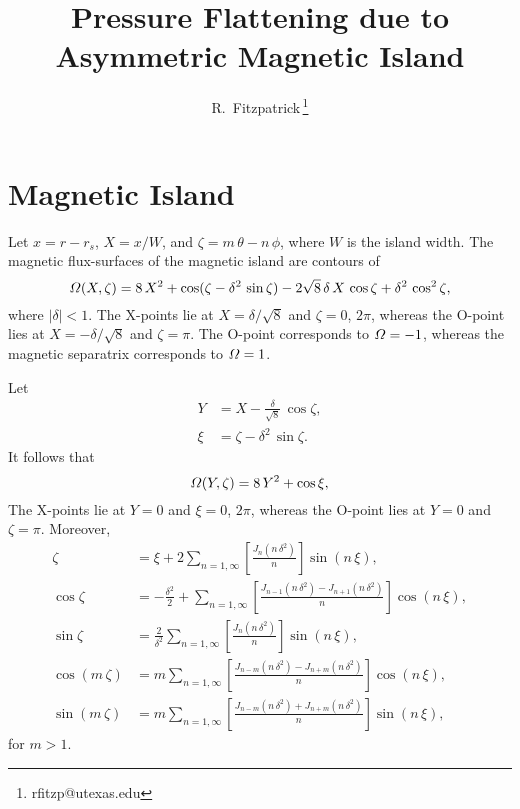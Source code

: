 \documentclass[12pt,prb,aps,notitlepage]{revtex4-1}
\begin{document}
\title{Pressure Flattening due to Asymmetric Magnetic Island}
\author{R.~Fitzpatrick\,\footnote{rfitzp@utexas.edu}}
\begin{abstract}
\end{abstract}
\maketitle

\section{Magnetic Island}
Let $x=r-r_s$, $X=x/W$, and $\zeta= m\,\theta-n\,\phi$, where $W$ is the island width. The magnetic flux-surfaces of the magnetic island are contours of
\begin{equation}
{\mit\Omega}(X,\zeta) = 8\,X^2 + \cos(\zeta-\delta^2\,\sin\zeta) - 2\sqrt{8}\,\delta\,X\,\cos\zeta+\delta^2\,\cos^2\zeta,
\end{equation}
where $|\delta|<1$. 
The X-points lie at $X=\delta/\sqrt{8}$ and $\zeta = 0$, $2\pi$, whereas the O-point lies at
$X=-\delta/\sqrt{8}$ and $\zeta=\pi$. The O-point corresponds to ${\mit\Omega}=-1$, whereas the magnetic separatrix corresponds to ${\mit\Omega}=1$.  

Let
\begin{align}
Y &= X -\frac{\delta}{\sqrt{8}}\,\cos\zeta,\\[0.5ex]
\xi &= \zeta-\delta^2\,\sin\zeta.
\end{align}
It follows that
\begin{equation}
{\mit\Omega}(Y,\zeta) = 8\,Y^2 +\cos\xi,
\end{equation}
The X-points lie at $Y=0$ and $\xi = 0$, $2\pi$, whereas the O-point lies at
$Y=0$ and $\zeta=\pi$. 
Moreover, 
\begin{align}
\zeta &= \xi+2\sum_{n=1,\infty} \left[\frac{J_n(n\,\delta^2)}{n}\right]\sin(n\,\xi),\\[0.5ex]
\cos\zeta&=-\frac{\delta^2}{2}+\sum_{n=1,\infty}\left[\frac{J_{n-1}(n\,\delta^2)-J_{n+1}(n\,\delta^2)}{n}\right]\cos(n\,\xi),\\[0.5ex]
\sin\zeta &= \frac{2}{\delta^2}\sum_{n=1,\infty} \left[\frac{J_n(n\,\delta^2)}{n}\right]\sin(n\,\xi),\\[0.5ex]
\cos(m\,\zeta)&= m\sum_{n=1,\infty}\left[\frac{J_{n-m}(n\,\delta^2)-J_{n+m}(n\,\delta^2)}{n}\right]\cos(n\,\xi),\\[0.5ex]
\sin(m\,\zeta) &= m\sum_{n=1,\infty}\left[\frac{J_{n-m}(n\,\delta^2)+J_{n+m}(n\,\delta^2)}{n}\right]\sin(n\,\xi),
\end{align}
for $m>1$. 
\end{document}
